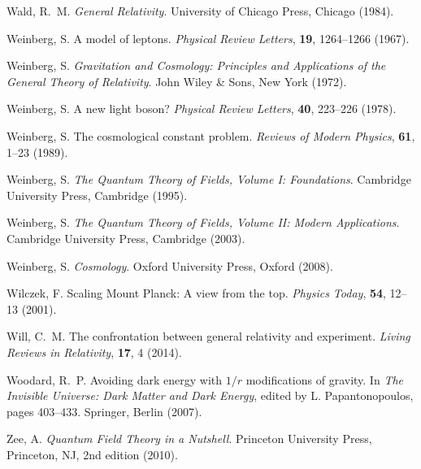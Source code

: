 \documentclass[12pt,a4paper]{article}
\begin{document}
\begin{thebibliography}{99}
		Wald, R.~M.
		\newblock \textit{General Relativity}.
		\newblock University of Chicago Press, Chicago (1984).
		
		Weinberg, S.
		\newblock A model of leptons.
		\newblock \textit{Physical Review Letters}, \textbf{19}, 1264--1266 (1967).
		\newblock {}
		
		Weinberg, S.
		\newblock \textit{Gravitation and Cosmology: Principles and Applications of the General Theory of Relativity}.
		\newblock John Wiley \& Sons, New York (1972).
		
		Weinberg, S.
		\newblock A new light boson?
		\newblock \textit{Physical Review Letters}, \textbf{40}, 223--226 (1978).
		\newblock {}
		
		Weinberg, S.
		\newblock The cosmological constant problem.
		\newblock \textit{Reviews of Modern Physics}, \textbf{61}, 1--23 (1989).
		\newblock {}
		
		Weinberg, S.
		\newblock \textit{The Quantum Theory of Fields, Volume I: Foundations}.
		\newblock Cambridge University Press, Cambridge (1995).
		
		Weinberg, S.
		\newblock \textit{The Quantum Theory of Fields, Volume II: Modern Applications}.
		\newblock Cambridge University Press, Cambridge (2003).
		
		Weinberg, S.
		\newblock \textit{Cosmology}.
		\newblock Oxford University Press, Oxford (2008).
		
		Wilczek, F.
		\newblock Scaling Mount Planck: A view from the top.
		\newblock \textit{Physics Today}, \textbf{54}, 12--13 (2001).
		\newblock {}
		
		Will, C.~M.
		\newblock The confrontation between general relativity and experiment.
		\newblock \textit{Living Reviews in Relativity}, \textbf{17}, 4 (2014).
		\newblock {}
		
		Woodard, R.~P.
		\newblock Avoiding dark energy with $1/r$ modifications of gravity.
		\newblock In \textit{The Invisible Universe: Dark Matter and Dark Energy}, edited by L. Papantonopoulos, pages 403--433. Springer, Berlin (2007).
		\newblock {}
		
		Zee, A.
		\newblock \textit{Quantum Field Theory in a Nutshell}.
		\newblock Princeton University Press, Princeton, NJ, 2nd edition (2010).
		
	\end{thebibliography}
	
\end{document}

